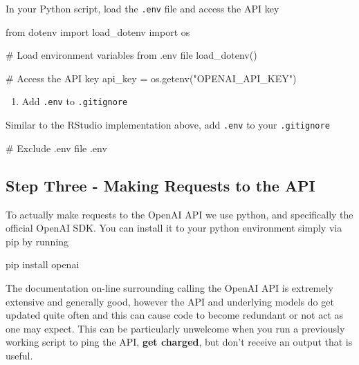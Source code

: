 \documentclass[
  letterpaper,
  DIV=11,
  numbers=noendperiod]{scrreprt}
\newenvironment{Shaded}{\begin{snugshade}}{\end{snugshade}}
\newcommand{\CommentTok}[1]{\textcolor[rgb]{0.37,0.37,0.37}{#1}}
\newcommand{\ImportTok}[1]{\textcolor[rgb]{0.00,0.46,0.62}{#1}}
\newcommand{\NormalTok}[1]{\textcolor[rgb]{0.00,0.23,0.31}{#1}}
\newcommand{\OperatorTok}[1]{\textcolor[rgb]{0.37,0.37,0.37}{#1}}
\newcommand{\StringTok}[1]{\textcolor[rgb]{0.13,0.47,0.30}{#1}}
\providecommand{\tightlist}{%
  \setlength{\itemsep}{0pt}\setlength{\parskip}{0pt}}\usepackage{longtable,booktabs,array}
\begin{document}
\begin{tcolorbox}
In your Python script, load the \texttt{.env} file and access the API
key

\begin{Shaded}
\begin{Highlighting}[]
\ImportTok{from}\NormalTok{ dotenv }\ImportTok{import}\NormalTok{ load\_dotenv}
\ImportTok{import}\NormalTok{ os}

\CommentTok{\# Load environment variables from .env file}
\NormalTok{load\_dotenv()}

\CommentTok{\# Access the API key}
\NormalTok{api\_key }\OperatorTok{=}\NormalTok{ os.getenv(}\StringTok{"OPENAI\_API\_KEY"}\NormalTok{)}
\end{Highlighting}
\end{Shaded}

\begin{enumerate}
\def\labelenumi{\arabic{enumi}.}
\setcounter{enumi}{3}
\tightlist
\item
  Add \texttt{.env} to \texttt{.gitignore}
\end{enumerate}

Similar to the RStudio implementation above, add \texttt{.env} to your
\texttt{.gitignore}

\begin{Shaded}
\begin{Highlighting}[]
\CommentTok{\# Exclude .env file}
\NormalTok{.env}
\end{Highlighting}
\end{Shaded}

\end{tcolorbox}

\subsection{Step Three - Making Requests to the
API}\label{step-three---making-requests-to-the-api}

To actually make requests to the OpenAI API we use python, and
specifically the official OpenAI SDK. You can install it to your python
environment simply via pip by running

\begin{Shaded}
\begin{Highlighting}[]
\NormalTok{pip install openai}
\end{Highlighting}
\end{Shaded}

The documentation on-line surrounding calling the OpenAI API is
extremely extensive and generally good, however the API and underlying
models do get updated quite often and this can cause code to become
redundant or not act as one may expect. This can be particularly
unwelcome when you run a previously working script to ping the API,
\textbf{get charged}, but don't receive an output that is useful.
\end{document}

